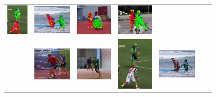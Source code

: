 \begin{figure}
\begin{tabular}{c c c c c c c}
    \includegraphics[height=0.140\linewidth]{imgidx_1589_graph_mpii_multi.pdf}&
    \includegraphics[height=0.140\linewidth]{imgidx_1183_graph_mpii_multi.pdf}&
    \includegraphics[height=0.140\linewidth]{imgidx_0568_graph_mpii_multi.pdf}&
    \includegraphics[height=0.140\linewidth]{imgidx_0804_graph_mpii_multi.pdf}\\
    &
    \includegraphics[height=0.140\linewidth]{imgidx_0908_sticks_mpii_multi.pdf}&
    \includegraphics[height=0.140\linewidth]{imgidx_0104_sticks_mpii_multi.pdf}&
    \includegraphics[height=0.140\linewidth]{imgidx_1589_sticks_mpii_multi.pdf}&
    \includegraphics[height=0.140\linewidth]{imgidx_1183_sticks_mpii_multi.pdf}&

\end{tabular}
\end{figure}
